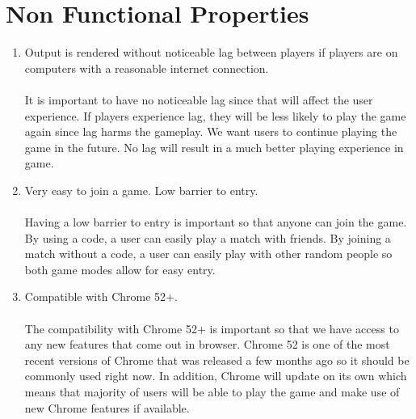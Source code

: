 \documentclass[11pt, oneside]{article}   	%
\begin{document}
\section{Non Functional Properties} 
\begin{enumerate}
\item
Output is rendered without noticeable lag between players if players are on computers with a reasonable internet connection. \\\\
It is important to have no noticeable lag since that will affect the user experience. If players experience lag, they will be less likely to play the game again since lag harms the gameplay. We want users to continue playing the game in the future. No lag will result in a much better playing experience in game.
\item
Very easy to join a game. Low barrier to entry.\\\\
Having a low barrier to entry is important so that anyone can join the game. By using a code, a user can easily play a match with friends. By joining a match without a code, a user can easily play with other random people so both game modes allow for easy entry.
\item
Compatible with Chrome 52+.\\\\
The compatibility with Chrome 52+ is important so that we have access to any new features that come out in browser. Chrome 52 is one of the most recent versions of Chrome that was released a few months ago so it should be commonly used right now. In addition, Chrome will update on its own which means that majority of users will be able to play the game and make use of new Chrome features if available.

\end{enumerate}

\clearpage
\end{document}
